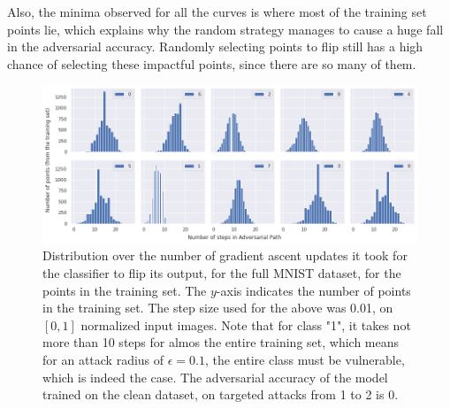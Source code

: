 \documentclass[12pt, oneside]{book}
\begin{document}
    Also, the minima observed for all the curves is where most of the training
    set points lie, which explains why the random strategy manages to cause a
    huge fall in the adversarial accuracy. Randomly selecting points to flip
    still has a high chance of selecting these impactful points, since there are
    so many of them.

    \begin{figure}[!h]
        \centering
        \includegraphics[scale=0.425]{full-MNIST-pgd-scores.png}
        \caption{Distribution over the number of gradient ascent updates it took
        for the classifier to flip its output, for the full MNIST dataset, for
        the points in the training set. The $y$-axis indicates the number of
        points in the training set. The step size used for the above was 0.01,
        on $[0, 1]$ normalized input images. Note that for class "1", it takes
        not more than 10 steps for almos the entire training set, which means
        for an attack radius of $\epsilon=0.1$, the entire class must be
        vulnerable, which is indeed the case. The adversarial accuracy of the
        model trained on the clean dataset, on targeted attacks from 1 to 2 is
        0.}
        \label{fig:full-mnist-pgd-path}
    \end{figure}

\end{document}
